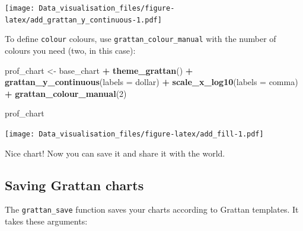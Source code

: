\documentclass[]{book}
\newenvironment{Shaded}{\begin{snugshade}}{\end{snugshade}}
\newcommand{\DataTypeTok}[1]{\textcolor[rgb]{0.13,0.29,0.53}{#1}}
\newcommand{\DecValTok}[1]{\textcolor[rgb]{0.00,0.00,0.81}{#1}}
\newcommand{\KeywordTok}[1]{\textcolor[rgb]{0.13,0.29,0.53}{\textbf{#1}}}
\newcommand{\NormalTok}[1]{#1}
\newcommand{\OperatorTok}[1]{\textcolor[rgb]{0.81,0.36,0.00}{\textbf{#1}}}
\newcommand{\StringTok}[1]{\textcolor[rgb]{0.31,0.60,0.02}{#1}}
\begin{document}
\texttt{[image: Data\_visualisation\_files/figure-latex/add\_grattan\_y\_continuous-1.pdf]}

To define \texttt{colour} colours, use \texttt{grattan\_colour\_manual} with the number of colours you need (two, in this case):

\begin{Shaded}
\begin{Highlighting}[]
\NormalTok{prof_chart <-}\StringTok{ }\NormalTok{base_chart }\OperatorTok{+}
\StringTok{        }\KeywordTok{theme_grattan}\NormalTok{() }\OperatorTok{+}
\StringTok{        }\KeywordTok{grattan_y_continuous}\NormalTok{(}\DataTypeTok{labels =}\NormalTok{ dollar) }\OperatorTok{+}
\StringTok{        }\KeywordTok{scale_x_log10}\NormalTok{(}\DataTypeTok{labels =}\NormalTok{ comma) }\OperatorTok{+}
\StringTok{        }\KeywordTok{grattan_colour_manual}\NormalTok{(}\DecValTok{2}\NormalTok{) }

\NormalTok{prof_chart}
\end{Highlighting}
\end{Shaded}

\texttt{[image: Data\_visualisation\_files/figure-latex/add\_fill-1.pdf]}

Nice chart! Now you can save it and share it with the world.

\hypertarget{saving-grattan-charts}{%
\subsection{Saving Grattan charts}\label{saving-grattan-charts}}

The \texttt{grattan\_save} function saves your charts according to Grattan templates. It takes these arguments:
\end{document}
